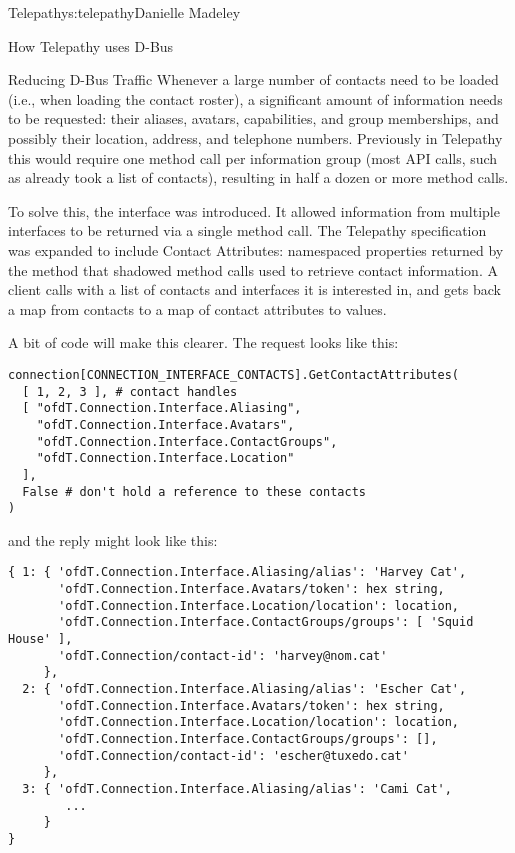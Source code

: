 \begin{aosachapter}{Telepathy}{s:telepathy}{Danielle Madeley}
\begin{aosasect1}{How Telepathy uses D-Bus}
\begin{aosasect2}{Reducing D-Bus Traffic}
Whenever a large number of contacts need to be loaded (i.e., when
loading the contact roster), a significant amount of information needs
to be requested: their aliases, avatars, capabilities, and group
memberships, and possibly their location, address, and telephone numbers.
Previously in Telepathy this would require one method call per
information group (most API calls, such as  already
took a list of contacts), resulting in half a dozen or more method calls.

To solve this, the  interface was introduced.  It
allowed information from multiple interfaces to be returned via a
single method call. The Telepathy specification was expanded to
include Contact Attributes: namespaced properties returned by the
 method that shadowed method calls used to
retrieve contact information. A client calls
 with a list of contacts and interfaces it
is interested in, and gets back a map from contacts to a map of
contact attributes to values.

A bit of code will make this clearer.  The request looks like this:

\begin{verbatim}
connection[CONNECTION_INTERFACE_CONTACTS].GetContactAttributes(
  [ 1, 2, 3 ], # contact handles
  [ "ofdT.Connection.Interface.Aliasing",
    "ofdT.Connection.Interface.Avatars",
    "ofdT.Connection.Interface.ContactGroups",
    "ofdT.Connection.Interface.Location"
  ],
  False # don't hold a reference to these contacts
)
\end{verbatim}

\noindent and the reply might look like this:

\begin{verbatim}
{ 1: { 'ofdT.Connection.Interface.Aliasing/alias': 'Harvey Cat',
       'ofdT.Connection.Interface.Avatars/token': hex string,
       'ofdT.Connection.Interface.Location/location': location,
       'ofdT.Connection.Interface.ContactGroups/groups': [ 'Squid House' ],
       'ofdT.Connection/contact-id': 'harvey@nom.cat'
     },
  2: { 'ofdT.Connection.Interface.Aliasing/alias': 'Escher Cat',
       'ofdT.Connection.Interface.Avatars/token': hex string,
       'ofdT.Connection.Interface.Location/location': location,
       'ofdT.Connection.Interface.ContactGroups/groups': [],
       'ofdT.Connection/contact-id': 'escher@tuxedo.cat'
     },
  3: { 'ofdT.Connection.Interface.Aliasing/alias': 'Cami Cat',
        ...
     }
}
\end{verbatim}


\end{aosasect2}
\end{aosasect1}
\end{aosachapter}
